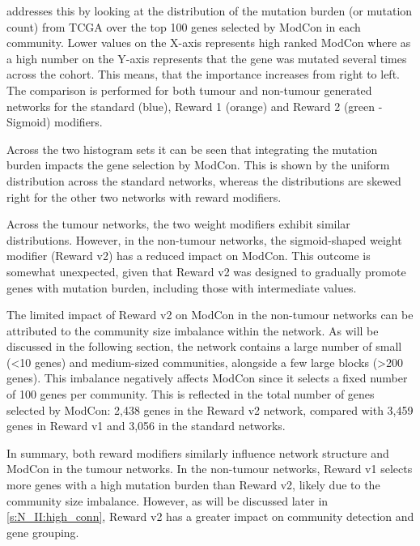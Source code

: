 addresses this by looking at the distribution of the mutation burden (or mutation count) from TCGA over the top 100 genes selected by ModCon in each community. Lower values on the X-axis represents high ranked ModCon where as a high number on the Y-axis represents that the gene was mutated several times across the cohort. This means, that the importance increases from right to left. The comparison is performed for both tumour and non-tumour generated networks for the standard (blue), Reward 1 (orange) and Reward 2 (green - Sigmoid) modifiers.

Across the two histogram sets it can be seen that integrating the mutation burden impacts the gene selection by ModCon. This is shown by the uniform distribution across the standard networks, whereas the distributions are skewed right for the other two networks with reward modifiers.

Across the tumour networks, the two weight modifiers exhibit similar distributions. However, in the non-tumour networks, the sigmoid-shaped weight modifier (Reward v2) has a reduced impact on ModCon. This outcome is somewhat unexpected, given that Reward v2 was designed to gradually promote genes with mutation burden, including those with intermediate values.

The limited impact of Reward v2 on ModCon in the non-tumour networks can be attributed to the community size imbalance within the network. As will be discussed in the following section, the network contains a large number of small (<10 genes) and medium-sized communities, alongside a few large blocks (>200 genes). This imbalance negatively affects ModCon since it selects a fixed number of 100 genes per community. This is reflected in the total number of genes selected by ModCon: 2,438 genes in the Reward v2 network, compared with 3,459 genes in Reward v1 and 3,056 in the standard networks.

In summary, both reward modifiers similarly influence network structure and ModCon in the tumour networks. In the non-tumour networks, Reward v1 selects more genes with a high mutation burden than Reward v2, likely due to the community size imbalance. However, as will be discussed later in \cref{s:N_II:high_conn}, Reward v2 has a greater impact on community detection and gene grouping.



